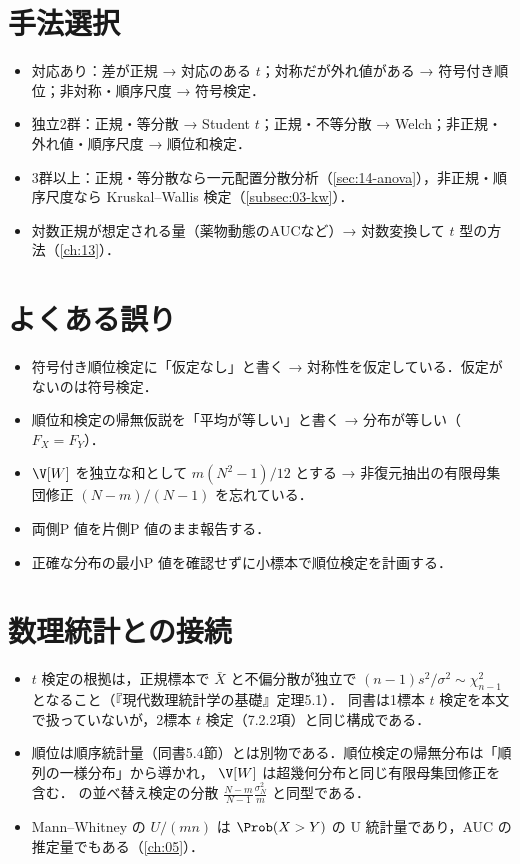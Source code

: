 \section{手法選択}\label{sec:03-choice}
\begin{itemize}
\item 対応あり：差が正規 → 対応のある $t$；対称だが外れ値がある → 符号付き順位；非対称・順序尺度 → 符号検定．
\item 独立2群：正規・等分散 → Student $t$；正規・不等分散 → Welch；非正規・外れ値・順序尺度 → 順位和検定．
\item 3群以上：正規・等分散なら一元配置分散分析（\cref{sec:14-anova}），非正規・順序尺度なら Kruskal--Wallis 検定（\cref{subsec:03-kw}）．
\item 対数正規が想定される量（薬物動態のAUCなど）→ 対数変換して $t$ 型の方法（\cref{ch:13}）．
\end{itemize}

\section{よくある誤り}\label{sec:03-err}
\begin{warnbox}
\begin{itemize}
\item 符号付き順位検定に「仮定なし」と書く → 対称性を仮定している．仮定がないのは符号検定．
\item 順位和検定の帰無仮説を「平均が等しい」と書く → 分布が等しい（$F_X=F_Y$）．
\item $\V[W]$ を独立な和として $m(N^2-1)/12$ とする → 非復元抽出の有限母集団修正 $(N-m)/(N-1)$ を忘れている．
\item 両側P 値を片側P 値のまま報告する．
\item 正確な分布の最小P 値を確認せずに小標本で順位検定を計画する．
\end{itemize}
\end{warnbox}

\section{数理統計との接続}\label{sec:03-link}
\begin{linkbox}
\begin{itemize}
\item $t$ 検定の根拠は，正規標本で $\bar X$ と不偏分散が独立で $(n-1)s^2/\sigma^2\sim\chi^2_{n-1}$ となること（『現代数理統計学の基礎』定理5.1）．
      同書は1標本 $t$ 検定を本文で扱っていないが，2標本 $t$ 検定（7.2.2項）と同じ構成である．
\item 順位は順序統計量（同書5.4節）とは別物である．順位検定の帰無分布は「順列の一様分布」から導かれ，
      $\V[W]$ は超幾何分布と同じ有限母集団修正を含む． の並べ替え検定の分散 $\frac{N-m}{N-1}\frac{\sigma_N^2}{m}$ と同型である．
\item Mann--Whitney の $U/(mn)$ は $\Prob(X>Y)$ の U 統計量であり，AUC の推定量でもある（\cref{ch:05}）．
\end{itemize}
\end{linkbox}

